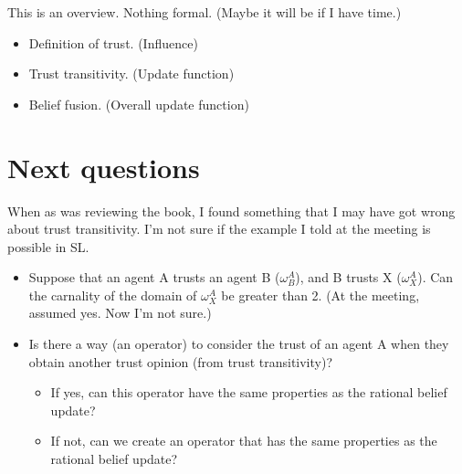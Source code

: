 \documentclass[a4paper,12pt]{article}
\theoremstyle{definition}
\numberwithin{equation}{section}
\begin{document}
This is an overview. Nothing formal. (Maybe it will be if I have time.)

\begin{itemize}
	\item Definition of trust. (Influence)
	
	\item Trust transitivity. (Update function)
	
	\item Belief fusion. (Overall update function)
\end{itemize}

\section{Next questions}

When as was reviewing the book, I found something that I may have got wrong about trust transitivity. I'm not sure if the example I told at the meeting is possible in SL.

\begin{itemize}
	\item Suppose that an agent A trusts an agent B ($\omega^A_B$), and B trusts X ($\omega^A_X$). Can the carnality of the domain of $\omega^A_X$ be greater than 2. (At the meeting, assumed yes. Now I'm not sure.)
	
	\item Is there a way (an operator) to consider the trust of an agent A when they obtain another trust opinion (from trust transitivity)?
	
	\begin{itemize}
		\item If yes, can this operator have the same properties as the rational belief update?
		
		\item If not, can we create an operator that has the same properties as the rational belief update?
	\end{itemize}
\end{itemize}
\end{document}
